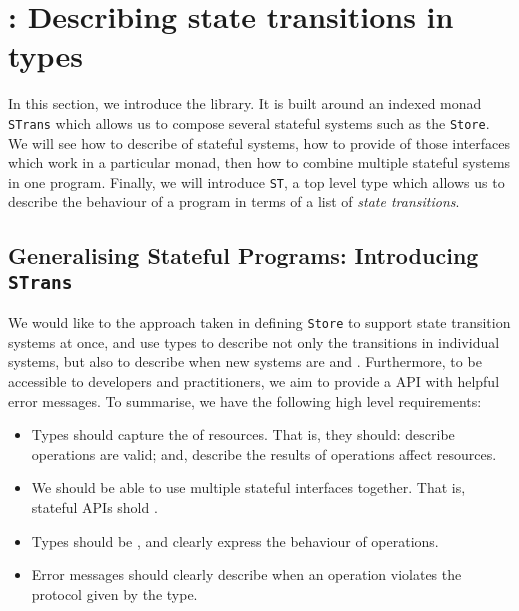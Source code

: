 \section{\states{}: Describing state transitions in types}

\label{sect:statemachines}

In this section, we introduce the \states{} library. It is built around
an indexed monad \texttt{STrans} which allows us to
compose several stateful systems such as the \texttt{Store}.
We will see how to describe 
of stateful systems, how to provide  of those interfaces
which work in a particular monad, then how to combine multiple stateful
systems in one program. Finally, we will introduce \texttt{ST}, a top level
type which allows us to describe the behaviour of a program in terms of a list
of \emph{state transitions}. 

\subsection{Generalising Stateful Programs: Introducing \texttt{STrans}}

\label{sect:strans}

We would like to  the approach taken in defining
\texttt{Store} to support  state transition systems at once,
and use types to describe not only the transitions in individual systems,
but also to describe when new systems are  and
. 
Furthermore, to be accessible to developers and practitioners, we aim to
provide a  API with helpful error messages.
To summarise, we have the following high level requirements:

\begin{itemize}
\item Types should capture the  of resources. That is,
they should:
describe  operations are valid; and,
describe  the results of operations affect resources.
\item We should be able to use multiple stateful interfaces together. That is,
stateful APIs shold .
\item Types should be , and clearly express the behaviour
of operations.
\item Error messages should clearly describe when an operation violates
the protocol given by the type.
\end{itemize}

